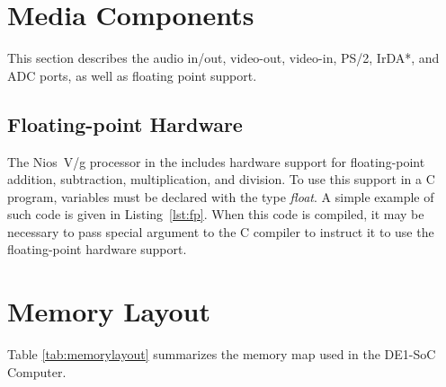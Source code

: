 \documentclass[11pt, twoside, pdftex]{article}
\newcommand{\commonFiles}{../../../common/doc}
\newcommand{\systemName}{DE1-SoC Computer}
\begin{document}
\section{Media Components}
\label{sec:multi}

This section describes the audio in/out, video-out, video-in, PS/2, IrDA*, and ADC ports,
as well as floating point support.










\subsection{Floating-point Hardware}
\label{sec:fp}

The Nios~V/g processor in the includes hardware support for
floating-point addition, subtraction, multiplication, and division. To use this support in
a C program, variables must be declared with the type {\it float}. A simple example of 
such code is given in Listing~\ref{lst:fp}. When this code is compiled, it may be necessary 
to pass special argument to the C compiler to instruct it to 
use the floating-point hardware support.





\section{Memory Layout}

\noindent
Table \ref{tab:memorylayout} summarizes the memory map used in the \systemName.
~\\
~\\
\end{document}
